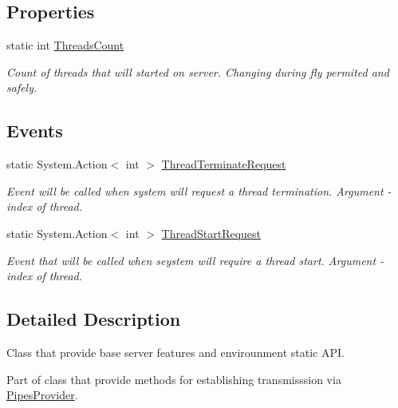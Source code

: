 \subsection*{Properties}
\begin{DoxyCompactItemize}
\item 
static int \mbox{\hyperlink{class_uniform_server_1_1_base_server_a31cc7d436bb2dd344ec275fd0fa0061e}{Threads\+Count}}
\begin{DoxyCompactList}\small\item\em Count of threads that will started on server. Changing during fly permited and safely. \end{DoxyCompactList}\end{DoxyCompactItemize}
\subsection*{Events}
\begin{DoxyCompactItemize}
\item 
static System.\+Action$<$ int $>$ \mbox{\hyperlink{class_uniform_server_1_1_base_server_a889c3aaa1cca7f4a9a4e32617516f4be}{Thread\+Terminate\+Request}}
\begin{DoxyCompactList}\small\item\em Event will be called when system will request a thread termination. Argument -\/ index of thread. \end{DoxyCompactList}\item 
static System.\+Action$<$ int $>$ \mbox{\hyperlink{class_uniform_server_1_1_base_server_a440a854a955ab7c5e563918c12e9b32c}{Thread\+Start\+Request}}
\begin{DoxyCompactList}\small\item\em Event that will be called when seystem will require a thread start. Argument -\/ index of thread. \end{DoxyCompactList}\end{DoxyCompactItemize}


\subsection{Detailed Description}
Class that provide base server features and envirounment static A\+PI. 

Part of class that provide methods for establishing transmisssion via \mbox{\hyperlink{namespace_pipes_provider}{Pipes\+Provider}}. 

